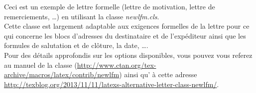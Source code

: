 \documentclass[12pt,addrfromleft,addrfromemail,addrfromphone,addrtoleft,orderdatefromto,stdletter,sigleft,dateleft]{newlfm}
\begin{document}
\begin{newlfm}
Ceci est un exemple de lettre formelle (lettre de motivation, lettre de
remerciements, \ldots) en utilisant la classe \emph{newlfm.cls}.\\

Cette classe est largement adaptable aux exigences formelles de la lettre pour ce
qui concerne les blocs d'adresses du destinataire et de l'expéditeur ainsi que les formules de salutation et de clôture, la date, \ldots. \\

Pour des détails approfondis sur les options disponibles, vous pouvez vous referez au manuel de la classe (\url{http://www.ctan.org/tex-archive/macros/latex/contrib/newlfm}) ainsi qu’ à cette adresse \url{http://texblog.org/2013/11/11/latexs-alternative-letter-class-newlfm/}.

\end{newlfm}
\end{document}
